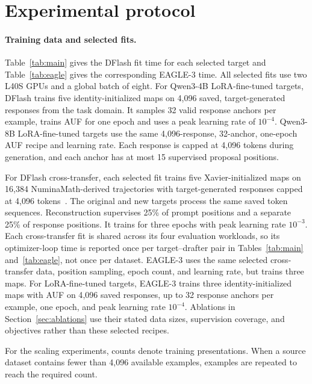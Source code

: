 \section{Experimental protocol}
\label{app:experimental-protocol}

\paragraph{Training data and selected fits.}
Table~\ref{tab:main} gives the DFlash fit time for each selected target and Table~\ref{tab:eagle} gives the corresponding EAGLE-3 time. All selected fits use two L40S GPUs and a global batch of eight. For Qwen3-4B LoRA-fine-tuned targets, DFlash trains five identity-initialized maps on 4{,}096 saved, target-generated responses from the task domain. It samples 32 valid response anchors per example, trains AUF for one epoch and uses a peak learning rate of $10^{-4}$. Qwen3-8B LoRA-fine-tuned targets use the same 4{,}096-response, 32-anchor, one-epoch AUF recipe and learning rate. Each response is capped at 4{,}096 tokens during generation, and each anchor has at most 15 supervised proposal positions.

For DFlash cross-transfer, each selected fit trains five Xavier-initialized maps on 16{,}384 NuminaMath-derived trajectories with target-generated responses capped at 4{,}096 tokens~\citep{li2024numinamath}. The original and new targets process the same saved token sequences. Reconstruction supervises 25\% of prompt positions and a separate 25\% of response positions. It trains for three epochs with peak learning rate $10^{-3}$. Each cross-transfer fit is shared across its four evaluation workloads, so its optimizer-loop time is reported once per target--drafter pair in Tables~\ref{tab:main} and~\ref{tab:eagle}, not once per dataset. EAGLE-3 uses the same selected cross-transfer data, position sampling, epoch count, and learning rate, but trains three maps. For LoRA-fine-tuned targets, EAGLE-3 trains three identity-initialized maps with AUF on 4{,}096 saved responses, up to 32 response anchors per example, one epoch, and peak learning rate $10^{-4}$. Ablations in Section~\ref{sec:ablations} use their stated data sizes, supervision coverage, and objectives rather than these selected recipes.

For the scaling experiments, counts denote training presentations. When a source dataset contains fewer than 4{,}096 available examples, examples are repeated to reach the required count.

